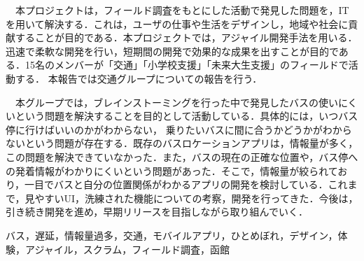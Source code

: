 \documentclass[openany,11pt,papersize,dvipdfm,draft]{jsbook}
\begin{document}
\maketitle

\frontmatter

\begin{jabstract}
　本プロジェクトは，フィールド調査をもとにした活動で発見した問題を，IT を用いて解決する．これは，ユーザの仕事や生活をデザインし，地域や社会に貢献することが目的である．本プロジェクトでは，アジャイル開発手法を用いる．迅速で柔軟な開発を行い，短期間の開発で効果的な成果を出すことが目的である．15名のメンバーが「交通」「小学校支援」「未来大生支援」のフィールドで活動する． 本報告では交通グループについての報告を行う．

　本グループでは，ブレインストーミングを行った中で発見したバスの使いにくいという問題を解決することを目的として活動している．具体的には，いつバス停に行けばいいのかがわからない， 乗りたいバスに間に合うかどうかがわからないという問題が存在する．既存のバスロケーションアプリは，情報量が多く，この問題を解決できていなかった．また，バスの現在の正確な位置や，バス停への発着情報がわかりにくいという問題があった．そこで，情報量が絞られており，一目でバスと自分の位置関係がわかるアプリの開発を検討している．これまで，見やすいUI，洗練された機能についての考察，開発を行ってきた．今後は，引き続き開発を進め，早期リリースを目指しながら取り組んでいく．
\begin{jkeyword}
バス，遅延，情報量過多，交通，モバイルアプリ，ひとめぼれ，デザイン，体験，アジャイル，スクラム，フィールド調査，函館
\end{jkeyword}
\end{jabstract}
\end{document}
